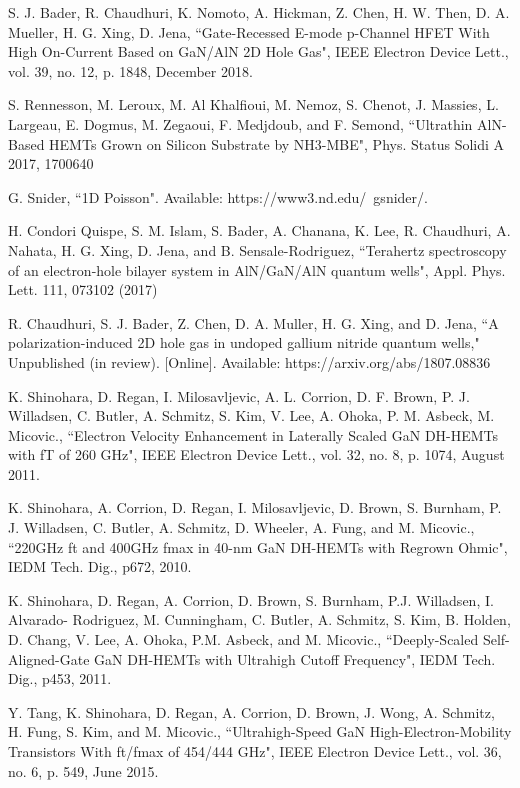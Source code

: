 \documentclass[journal]{IEEEtran}
\begin{document}
\begin{thebibliography}{00}
 S. J. Bader, R. Chaudhuri, K. Nomoto, A. Hickman, Z. Chen, H. W. Then, D. A. Mueller, H. G. Xing, D. Jena, ``Gate-Recessed E-mode p-Channel HFET With High On-Current Based on GaN/AlN 2D Hole Gas", IEEE Electron Device Lett., vol. 39, no. 12, p. 1848, December 2018.

 S. Rennesson, M. Leroux, M. Al Khalfioui, M. Nemoz, S. Chenot, J. Massies, L. Largeau, E. Dogmus, M. Zegaoui, F. Medjdoub, and F. Semond, ``Ultrathin AlN-Based HEMTs Grown on Silicon Substrate by NH3-MBE", Phys. Status Solidi A 2017, 1700640

 G. Snider, ``1D Poisson".  Available: https://www3.nd.edu/~gsnider/.

 H. Condori Quispe, S. M. Islam, S. Bader, A. Chanana, K. Lee, R. Chaudhuri, A. Nahata, H. G. Xing, D. Jena, and B. Sensale-Rodriguez, ``Terahertz spectroscopy of an electron-hole bilayer system in AlN/GaN/AlN quantum wells", Appl. Phys. Lett. 111, 073102 (2017)

 R. Chaudhuri, S. J. Bader, Z. Chen, D. A. Muller, H. G. Xing, and D. Jena, ``A polarization-induced 2D hole gas in undoped gallium nitride quantum wells," Unpublished (in review). [Online]. Available: https://arxiv.org/abs/1807.08836

 K. Shinohara, D. Regan, I. Milosavljevic, A. L. Corrion, D. F. Brown, P. J. Willadsen, C. Butler, A. Schmitz, S. Kim, V. Lee, A. Ohoka, P. M. Asbeck, M. Micovic., ``Electron Velocity Enhancement in Laterally Scaled GaN DH-HEMTs with fT of 260 GHz", IEEE Electron Device Lett., vol. 32, no. 8, p. 1074, August 2011.

 K. Shinohara, A. Corrion, D. Regan, I. Milosavljevic, D. Brown, S. Burnham, P. J. Willadsen, C. Butler, A. Schmitz, D. Wheeler, A. Fung, and M. Micovic., ``220GHz ft and 400GHz fmax in 40-nm GaN DH-HEMTs with Regrown Ohmic", IEDM Tech. Dig., p672, 2010.

 K. Shinohara, D. Regan, A. Corrion, D. Brown, S. Burnham, P.J. Willadsen, I. Alvarado- Rodriguez, M. Cunningham, C. Butler, A. Schmitz, S. Kim, B. Holden, D. Chang, V. Lee, A. Ohoka, P.M. Asbeck, and M. Micovic., ``Deeply-Scaled Self-Aligned-Gate GaN DH-HEMTs with Ultrahigh Cutoff Frequency", IEDM Tech. Dig., p453, 2011.

 Y. Tang, K. Shinohara, D. Regan, A. Corrion, D. Brown, J. Wong, A. Schmitz, H. Fung, S. Kim, and M. Micovic., ``Ultrahigh-Speed GaN High-Electron-Mobility Transistors With ft/fmax of 454/444 GHz",  IEEE Electron Device Lett., vol. 36, no. 6, p. 549, June 2015.


\end{thebibliography}
\end{document}
